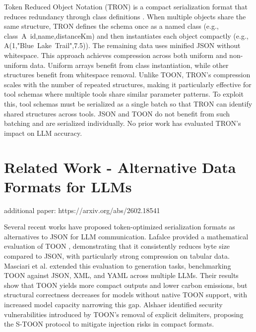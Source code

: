 \documentclass[11pt]{article}
\begin{document}
Token Reduced Object Notation (TRON) is a compact serialization format that reduces redundancy through class definitions \citep{tron-format/tron-javascript_2026, TRON_Format_2026}. When multiple objects share the same structure, TRON defines the schema once as a named class (e.g., class~A~id,name,distanceKm) and then instantiates each object compactly (e.g., A(1,"Blue~Lake~Trail",7.5)). The remaining data uses minified JSON without whitespace. This approach achieves compression across both uniform and non-uniform data. Uniform arrays benefit from class instantiation, while other structures benefit from whitespace removal. Unlike TOON, TRON's compression scales with the number of repeated structures, making it particularly effective for tool schemas where multiple tools share similar parameter patterns. To exploit this, tool schemas must be serialized as a single batch so that TRON can identify shared structures across tools. JSON and TOON do not benefit from such batching and are serialized individually. No prior work has evaluated TRON's impact on LLM accuracy.


\section{Related Work - Alternative Data Formats for LLMs}
\label{sec:related_work}

additional paper: https://arxiv.org/abs/2602.18541

Several recent works have proposed token-optimized serialization formats as alternatives to JSON for LLM communication. Lafalce \citep{Lafalce_2025} provided a mathematical evaluation of TOON \citep{toon-format/toon_2026}, demonstrating that it consistently reduces byte size compared to JSON, with particularly strong compression on tabular data. Masciari et al. \citep{Masciari_Moscato_Napolitano_Orlando_Perillo_Russo_2026} extended this evaluation to generation tasks, benchmarking TOON against JSON, XML, and YAML across multiple LLMs. Their results show that TOON yields more compact outputs and lower carbon emissions, but structural correctness decreases for models without native TOON support, with increased model capacity narrowing this gap. Alshaer \citep{Alshaer} identified security vulnerabilities introduced by TOON's removal of explicit delimiters, proposing the S-TOON protocol to mitigate injection risks in compact formats.
\end{document}
